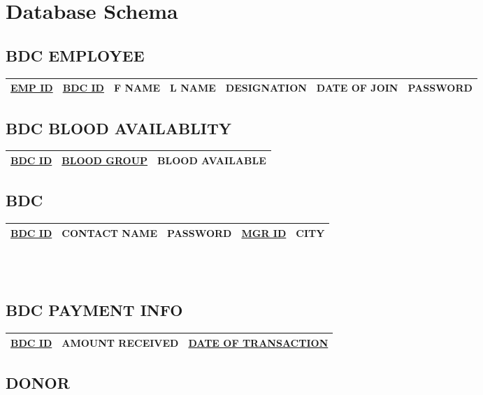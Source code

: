 \begin{sloppypar}
\section{Database Schema}

\subsection{BDC EMPLOYEE}

\begin{tabular}{ | c | c | c | c | c | c | c | }
 \hline
 \underline{EMP ID} & \underline{BDC ID} & F NAME & L NAME & DESIGNATION & DATE OF JOIN & PASSWORD \\
 \hline
\end{tabular}

\subsection{BDC BLOOD AVAILABLITY}

\begin{tabular}{ | c | c | c | }
 \hline
 \underline{BDC ID} & \underline{BLOOD GROUP} & BLOOD AVAILABLE \\
 \hline
\end{tabular}

\subsection{BDC}

\begin{tabular}{ | c | c | c | c | c | }
 \hline
 \underline{BDC ID} & CONTACT NAME & PASSWORD & \underline{MGR ID} & CITY \\
 \hline
\end{tabular} \\ \\

\subsection{BDC PAYMENT INFO}

\begin{tabular}{ | c | c | c | }
 \hline
 \underline{BDC ID} & AMOUNT RECEIVED & \underline{DATE OF TRANSACTION} \\
 \hline
\end{tabular}

\subsection{DONOR}


\end{sloppypar}
